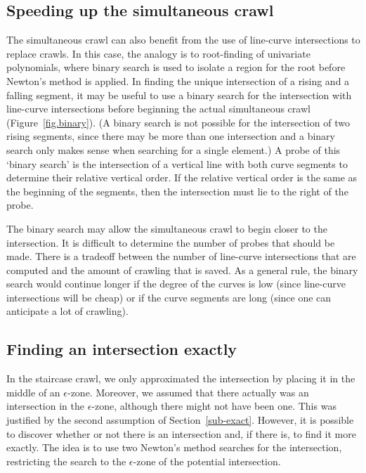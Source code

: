 
\subsection{Speeding up the simultaneous crawl}
\label{sub-linecurve2}

The simultaneous crawl can also benefit from the use of line-curve intersections to replace 
crawls.
In this case, the analogy is to root-finding of univariate polynomials, where binary search 
is used to isolate a region for the root before Newton's method is applied.
In finding the unique intersection of a rising and a falling segment, it may be useful to 
use a binary search for the intersection with line-curve intersections
before beginning the actual simultaneous crawl (Figure~\ref{fig.binary}).
(A binary 
	search is not possible for the intersection of two rising segments, since
	there may be more than one intersection and a binary search only makes sense when
	searching for a single element.)
A probe of this `binary search' is the intersection of a vertical line with both curve 
segments to determine their relative vertical order.  
If the relative vertical order is the same as the beginning of the segments, 
then the intersection must lie to the right of the probe.

The binary search may allow the simultaneous crawl to begin closer to the intersection.
It is difficult to determine the number of probes that should be made.
There is a tradeoff between the number of line-curve intersections
that are computed and the amount of crawling that is saved.
As a general rule, the binary search would continue longer if the degree
of the curves is low (since line-curve intersections will be cheap) or
if the curve segments are long (since one can anticipate a lot of crawling).

\subsection{Finding an intersection exactly}
\label{sub-exact2}

In the staircase crawl, we only approximated the intersection by placing it in the middle
of an $\epsilon$-zone.
Moreover, we assumed that there actually was an intersection in the $\epsilon$-zone, although
there might not have been one.
This was justified by the second assumption of Section~\ref{sub-exact}.
However, it is possible to discover whether or not there is an intersection and, if there is,
to find it more exactly.
The idea is to use two Newton's method searches for the intersection, restricting the search
to the $\epsilon$-zone of the potential intersection.

